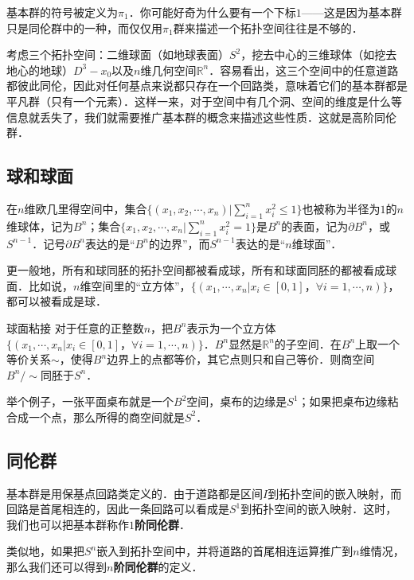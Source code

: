 

基本群的符号被定义为$\pi_1$．你可能好奇为什么要有一个下标$1$——这是因为基本群只是同伦群中的一种，而仅仅用$\pi_1$群来描述一个拓扑空间往往是不够的．

考虑三个拓扑空间：二维球面（如地球表面）$S^2$，挖去中心的三维球体（如挖去地心的地球）$D^3-x_0$以及$n$维几何空间$\mathbb{R}^n$．容易看出，这三个空间中的任意道路都彼此同伦，因此对任何基点来说都只存在一个回路类，意味着它们的基本群都是平凡群（只有一个元素）．这样一来，对于空间中有几个洞、空间的维度是什么等信息就丢失了，我们就需要推广基本群的概念来描述这些性质．这就是高阶同伦群．

\subsection{球和球面}
在$n$维欧几里得空间中，集合$\{(x_1, x_2,\cdots,x_n)|\sum^n_{i=1}x_i^2\leq 1\}$也被称为半径为$1$的$n$维球体，记为$B^n$；集合$\{x_1, x_2, \cdots, x_n|\sum^n_{i=1}x_i^2=1\}$是$B^n$的表面，记为$\partial B^n$，或$S^{n-1}$．记号$\partial B^n$表达的是“$B^n$的边界”，而$S^{n-1}$表达的是“$n$维球面”．

更一般地，所有和球同胚的拓扑空间都被看成球，所有和球面同胚的都被看成球面．比如说，$n$维空间里的“立方体”，$\{(x_1, \cdots, x_n|x_i\in[0, 1]，\forall i=1, \cdots, n)\}$，都可以被看成是球．

\begin{theorem}{球面粘接}
对于任意的正整数$n$，把$B^n$表示为一个立方体$\{(x_1, \cdots, x_n|x_i\in[0, 1]，\forall i=1, \cdots, n)\}$．$B^n$显然是$\mathbb{R}^n$的子空间．在$B^n$上取一个等价关系$\sim$，使得$B^n$边界上的点都等价，其它点则只和自己等价．则商空间$B^n/\sim$同胚于$S^n$．
\end{theorem}

举个例子，一张平面桌布就是一个$B^2$空间，桌布的边缘是$S^1$；如果把桌布边缘粘合成一个点，那么所得的商空间就是$S^2$．

\subsection{同伦群}

基本群是用保基点回路类定义的．由于道路都是区间$I$到拓扑空间的嵌入映射，而回路是首尾相连的，因此一条回路可以看成是$S^1$到拓扑空间的嵌入映射．这时，我们也可以把基本群称作$1$\textbf{阶同伦群}．

类似地，如果把$S^n$嵌入到拓扑空间中，并将道路的首尾相连运算推广到$n$维情况，那么我们还可以得到$n$\textbf{阶同伦群}的定义．

